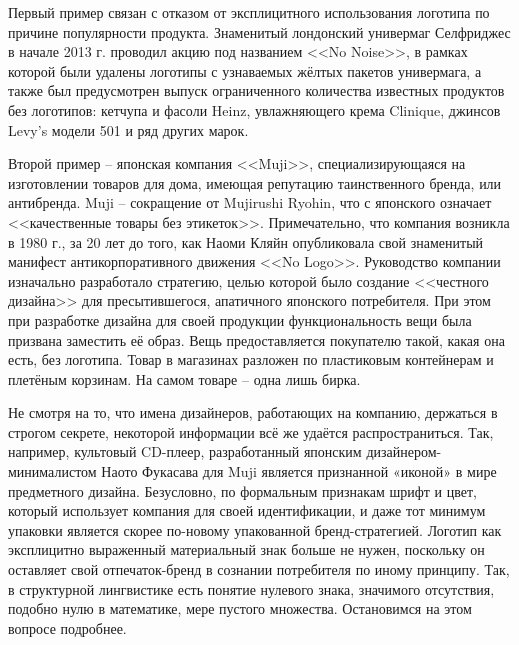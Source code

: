 Первый пример связан с отказом от эксплицитного использования логотипа по причине популярности
продукта. Знаменитый лондонский универмаг Селфриджес в начале 2013 г. проводил акцию под названием
<<No Noise>>, в рамках которой были удалены логотипы с узнаваемых жёлтых пакетов универмага, а также
был предусмотрен выпуск ограниченного количества известных продуктов без логотипов: кетчупа и фасоли
Heinz, увлажняющего крема Clinique, джинсов Levy's модели 501 и ряд других марок.

Второй пример -- японская компания <<Muji>>, специализирующаяся на изготовлении товаров для дома,
имеющая репутацию таинственного бренда, или антибренда. Muji -- сокращение от Mujirushi
Ryohin, что с японского означает <<качественные товары без этикеток>>. Примечательно, что
компания возникла в 1980 г., за 20 лет до того, как Наоми Кляйн опубликовала свой знаменитый
манифест антикорпоративного движения <<No Logo>>. Руководство компании изначально разработало
стратегию, целью которой было создание <<честного дизайна>> для пресытившегося, апатичного японского
потребителя. При этом при разработке дизайна для своей продукции функциональность вещи была призвана
заместить её образ. Вещь предоставляется покупателю такой, какая она есть, без логотипа. Товар в
магазинах разложен по пластиковым контейнерам и плетёным корзинам. На самом товаре -- одна лишь
бирка.

Не смотря на то, что имена дизайнеров, работающих на компанию, держаться в строгом секрете, некоторой информации всё же удаётся распространиться. Так, например, культовый CD-плеер, разработанный японским дизайнером-минималистом Наото Фукасава для Muji является признанной «иконой» в мире предметного дизайна. Безусловно, по формальным признакам шрифт и цвет, который использует компания для своей идентификации, и даже тот минимум упаковки является скорее  по-новому упакованной бренд-стратегией.  Логотип как эксплицитно выраженный материальный знак больше не нужен, поскольку он  оставляет свой отпечаток-бренд в сознании потребителя по иному принципу. Так, в структурной лингвистике есть понятие нулевого знака, значимого отсутствия, подобно нулю в математике, мере пустого множества. Остановимся на этом вопросе подробнее. 

